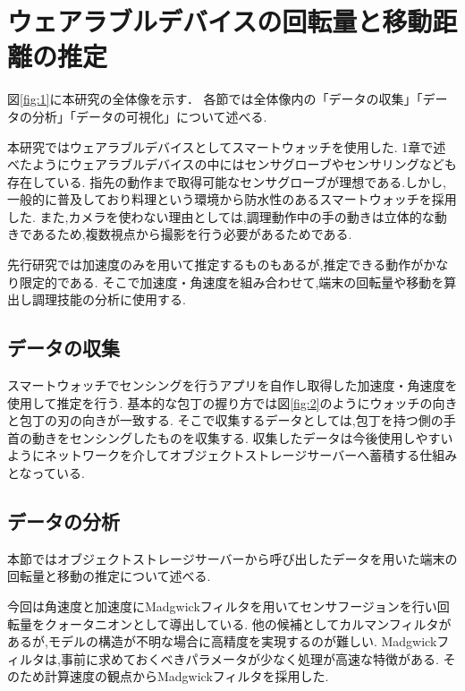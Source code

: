 \section{ウェアラブルデバイスの回転量と移動距離の推定}
図\ref{fig:1}に本研究の全体像を示す．
各節では全体像内の「データの収集」「データの分析」「データの可視化」について述べる.

本研究ではウェアラブルデバイスとしてスマートウォッチを使用した.
1章で述べたようにウェアラブルデバイスの中にはセンサグローブやセンサリングなども存在している.
指先の動作まで取得可能なセンサグローブが理想である.しかし,一般的に普及しており料理という環境から防水性のあるスマートウォッチを採用した.
また,カメラを使わない理由としては,調理動作中の手の動きは立体的な動きであるため,複数視点から撮影を行う必要があるためである.

先行研究\cite{kumazawaanalysis}では加速度のみを用いて推定するものもあるが,推定できる動作がかなり限定的である.
そこで加速度・角速度を組み合わせて,端末の回転量や移動を算出し調理技能の分析に使用する.


\subsection{データの収集}
スマートウォッチでセンシングを行うアプリを自作し取得した加速度・角速度を使用して推定を行う.
基本的な包丁の握り方では図\ref{fig:2}のようにウォッチの向きと包丁の刃の向きが一致する.
そこで収集するデータとしては,包丁を持つ側の手首の動きをセンシングしたものを収集する.
収集したデータは今後使用しやすいようにネットワークを介してオブジェクトストレージサーバーへ蓄積する仕組みとなっている.
\subsection{データの分析}
本節ではオブジェクトストレージサーバーから呼び出したデータを用いた端末の回転量と移動の推定について述べる.

今回は角速度と加速度にMadgwickフィルタを用いてセンサフージョンを行い回転量をクォータニオンとして導出している.
他の候補としてカルマンフィルタがあるが,モデルの構造が不明な場合に高精度を実現するのが難しい.
Madgwickフィルタは,事前に求めておくべきパラメータが少なく処理が高速な特徴がある.
そのため計算速度の観点からMadgwickフィルタを採用した.

